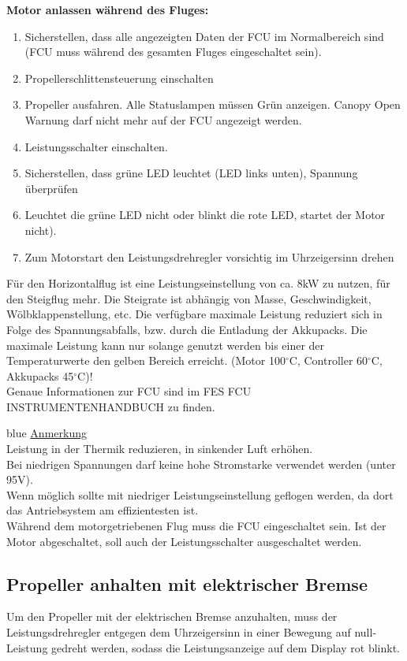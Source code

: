 \textbf{Motor anlassen während des Fluges:}
\begin{enumerate}
\item Sicherstellen, dass alle angezeigten Daten der FCU im Normalbereich sind (FCU muss während des gesamten Fluges eingeschaltet sein).
\item Propellerschlittensteuerung einschalten
\item Propeller ausfahren. Alle Statuslampen müssen Grün anzeigen. Canopy Open Warnung darf nicht mehr auf der FCU angezeigt werden.
\item Leistungsschalter einschalten.
\item Sicherstellen, dass grüne LED leuchtet (LED links unten), Spannung überprüfen
\item Leuchtet die grüne LED nicht oder blinkt die rote LED, startet der Motor nicht). 
\item Zum Motorstart den Leistungsdrehregler vorsichtig im Uhrzeigersinn drehen
\end{enumerate}

Für den Horizontalflug ist eine Leistungseinstellung von ca. 8kW zu nutzen, für den
Steigflug mehr. Die Steigrate ist abhängig von Masse, Geschwindigkeit, Wölbklappenstellung, etc.
Die verfügbare maximale Leistung reduziert sich in Folge des Spannungsabfalls, bzw.
durch die Entladung der Akkupacks. Die maximale Leistung kann nur solange genutzt werden bis einer der Temperaturwerte den gelben Bereich erreicht. (Motor 100$^\circ$C, Controller 60$^\circ$C, Akkupacks 45$^\circ$C)!\\

Genaue Informationen zur FCU sind im FES FCU INSTRUMENTENHANDBUCH zu finden.\\

\begin{color}{blue}
\large{\underline{Anmerkung}}\\
Leistung in der Thermik reduzieren, in sinkender Luft erhöhen.\\
Bei niedrigen Spannungen darf keine hohe Stromstarke verwendet werden (unter
95V).\\
Wenn möglich sollte mit niedriger Leistungseinstellung geflogen werden, da dort das
Antriebsystem am effizientesten ist.\\
Während dem motorgetriebenen Flug muss die FCU eingeschaltet sein. Ist der Motor
abgeschaltet, soll auch der Leistungsschalter ausgeschaltet werden.
\end{color}

\subsection{Propeller anhalten mit elektrischer Bremse}
Um den Propeller mit der elektrischen Bremse anzuhalten, muss der Leistungsdrehregler entgegen dem Uhrzeigersinn in einer Bewegung auf null-Leistung gedreht werden, sodass die Leistungsanzeige auf dem Display rot blinkt.

